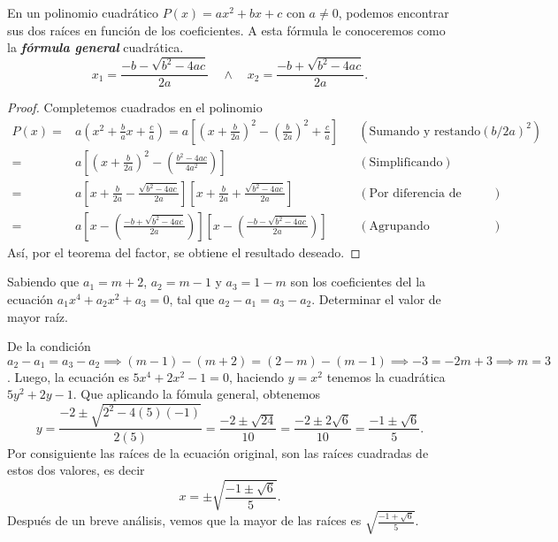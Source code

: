 En un polinomio cuadrático $P(x) = ax^2 + bx + c$ con $a \neq 0$, podemos encontrar sus dos raíces en función de los coeficientes.
A esta fórmula le conoceremos como la \textbf{\emph{fórmula general}} cuadrática.
\[
    x_1 = \frac{-b - \sqrt {b^2 - 4ac}}{2a}\quad\land\quad x_2 = \frac{-b + \sqrt {b^2 - 4ac}}{2a}.
\]
\begin{proof}
    Completemos cuadrados en el polinomio
    \begin{align*}
        P(x) =& a \left( x^2 + \frac{b}{a}x + \frac{c}{a} \right) = a \left[ \left( x + \frac{b}{2a} \right)^2 - \left( \frac{b}{2a} \right)^2 + \frac{c}{a} \right] && (\text{Sumando y restando} \left( b/2a \right)^2)\\
        =& a \left[ \left( x + \frac{b}{2a} \right)^2 - \left( \frac{b^2 - 4ac}{4a^2}\right) \right]  && (\text{Simplificando})\\
        =& a \left[ x + \frac{b}{2a} - \frac{\sqrt {b^2 - 4ac}}{2a}\right]\left[ x + \frac{b}{2a} + \frac{\sqrt {b^2 - 4ac}}{2a}\right]  && (\text{Por diferencia de cuadrados})\\
        =& a \left[ x - \left( \frac{-b + \sqrt {b^2 - 4ac}}{2a} \right) \right]\left[ x - \left( \frac{-b - \sqrt {b^2 - 4ac}}{2a} \right) \right] && (\text{Agrupando coeficientes})
    \end{align*}
    Así, por el teorema del factor, se obtiene el resultado deseado.
\end{proof}

\begin{example}
    Sabiendo que $a_1 = m + 2$, $a_2 = m - 1$ y $a_3 = 1 - m$ son los coeficientes del la ecuación $a_1 x^4 + a_2 x^2 + a_3 = 0$, tal que $a_2 - a_1 = a_3 - a_2$.
    Determinar el valor de mayor raíz.
\end{example}
\begin{solution}
    De la condición $a_2 - a_1 = a_3 - a_2 \implies (m - 1) - (m + 2) = (2 - m) - (m - 1) \implies -3 = -2m + 3 \implies m = 3$.
    Luego, la ecuación es $5x^4 + 2x^2 - 1 = 0$, haciendo $y = x^2$ tenemos la cuadrática $5y^2 + 2y - 1$.
    Que aplicando la fómula general, obtenemos
    \[
        y = \frac{-2 \pm \sqrt{2^2 - 4(5)(-1)}}{2(5)} = \frac{-2 \pm \sqrt{24}}{10} = \frac{-2 \pm 2\sqrt{6}}{10} = \frac{-1 \pm \sqrt{6}}{5}.
    \]
    Por consiguiente las raíces de la ecuación original, son las raíces cuadradas de estos dos valores, es decir
    \[
        x = \pm \sqrt {\frac{-1 \pm \sqrt{6}}{5}}.
    \]
    Después de un breve análisis, vemos que la mayor de las raíces es $\sqrt {\frac{-1 + \sqrt{6}}{5}}$.
\end{solution}

